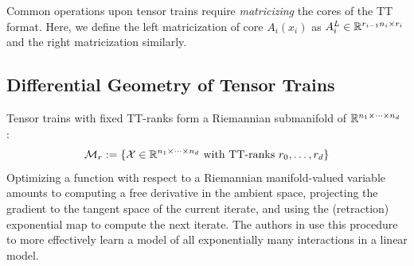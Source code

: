 Common operations upon tensor trains require \textit{matricizing} the cores of the TT format. Here, we define the left matricization of core $A_i(x_i)$ as $A_i^L \in \mathbb{R}^{r_{i-1}n_i \times r_i} $ and the right matricization similarly.


\subsection{Differential Geometry of Tensor Trains}
Tensor trains with fixed TT-ranks form a Riemannian submanifold of $\mathbb{R}^{n_1 \times \cdots \times n_d}$ \cite{lubich2015time, holtz2012manifolds}:
\begin{align}\label{eq:riem}
	\mathcal{M}_r := \{ \mathcal{X} \in \mathbb{R}^{n_1 \times \cdots \times n_d} \text{ with TT-ranks } r_0,\ldots,r_d\} 
\end{align}
Optimizing a function with respect to a Riemannian manifold-valued variable amounts to computing a free derivative in the ambient space, projecting the gradient to the tangent space of the current iterate, and using the (retraction) exponential map to compute the next iterate.
The authors in \cite{novikov2016exponential} use this procedure to more effectively learn a model of all exponentially many interactions in a linear model.
